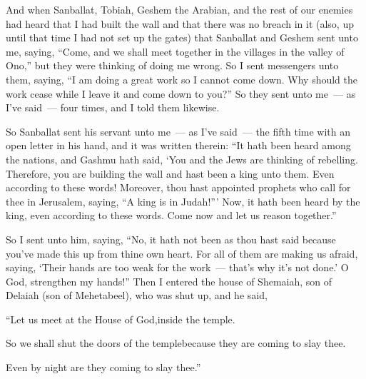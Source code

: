 
\begin{inparaenum}
   And when Sanballat, Tobiah, Geshem the Arabian, and the rest of our enemies had heard that I had built the wall and that there was no breach in it (also, up until that time I had not set up the gates)%
   that Sanballat and Geshem sent unto me, saying, ``Come, and we shall meet together in the villages in the valley of Ono,'' but they were thinking of doing me wrong.%
   So I sent messengers unto them, saying, ``I am doing a great work so I cannot come down. Why should the work cease while I leave it and come down to you?''%
   So they sent unto me~--- as I've said~--- four times, and I told them likewise.%

   So Sanballat sent his servant unto me~--- as I've said~--- the fifth time with an open letter in his hand,%
   and it was written therein: ``It hath been heard among the nations, and Gashmu hath said, `You and the Jews are thinking of rebelling. Therefore, you are building the wall and hast been a king unto them. Even according to these words!%
   Moreover, thou hast appointed prophets who call for thee in Jerusalem, saying, ``A king is in Judah!''' Now, it hath been heard by the king, even according to these words. Come now and let us reason together.''%

   So I sent unto him, saying, ``No, it hath not been as thou hast said because you've made this up from thine own heart.%
   For all of them are making us afraid, saying, `Their hands are too weak for the work~--- that's why it's not done.' O God, strengthen my hands!''%
   Then I entered the house of Shemaiah, son of Delaiah (son of Mehetabeel), who was shut up, and he said,\smallskip%

  \pc{}``Let us meet at the House of God,\pa{}inside the temple.%

  \pc{}So we shall shut the doors of the temple\pa{}because they are coming to slay thee.%

  \pc{}Even by night are they coming to slay thee.''\smallskip%


\end{inparaenum}
